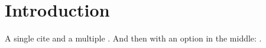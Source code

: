 \documentclass{article}
\begin{document}
\section{Introduction}

A single cite \cite{MR1451594}
and a multiple \cites{Weyl,Gould,Rob,MR95f:17013,Ser77}.
And then with an option in the middle:
.

\begin{bibsection}
\begin{biblist}
\end{biblist}
\end{bibsection}
\end{document}
